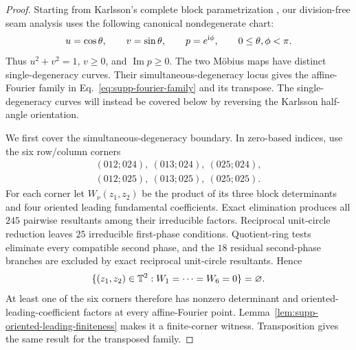 \begin{proof}
Starting from Karlsson's complete block parametrization \cite{Karlsson2011H2,Karlsson2011ThreeParameter}, our division-free seam analysis uses the following canonical nondegenerate chart:
\begin{equation}
u=\cos\theta,\qquad v=\sin\theta,\qquad p=e^{\mathrm i\phi},
\qquad
0\leq\theta,\phi<\pi.
\label{eq:supp-karlsson-canonical}
\end{equation}
Thus $u^2+v^2=1$, $v\geq0$, and $\operatorname{Im}p\geq0$. The two M\"obius maps have distinct single-degeneracy curves.  Their simultaneous-degeneracy locus gives the affine-Fourier family in Eq.~\eqref{eq:supp-fourier-family} and its transpose.  The single-degeneracy curves will instead be covered below by reversing the Karlsson half-angle orientation.

We first cover the simultaneous-degeneracy boundary. In zero-based indices, use the six row/column corners
\begin{equation}
\begin{gathered}
(012;024),\ (013;024),\ (025;024),\\
(012;025),\ (013;025),\ (025;025).
\end{gathered}
\label{eq:supp-fourier-six-corners}
\end{equation}
For each corner let $W_\nu(z_1,z_2)$ be the product of its three block determinants and four oriented leading fundamental coefficients. Exact elimination produces all $245$ pairwise resultants among their irreducible factors. Reciprocal unit-circle reduction leaves $25$ irreducible first-phase conditions. Quotient-ring tests eliminate every compatible second phase, and the $18$ residual second-phase branches are excluded by exact reciprocal unit-circle resultants. Hence
\begin{equation}
\{(z_1,z_2)\in\mathbb T^2:W_1=\cdots=W_6=0\}=\varnothing.
\label{eq:supp-fourier-no-common-zero}
\end{equation}
At least one of the six corners therefore has nonzero determinant and oriented-leading-coefficient factors at every affine-Fourier point. Lemma~\ref{lem:supp-oriented-leading-finiteness} makes it a finite-corner witness. Transposition gives the same result for the transposed family.


\end{proof}
